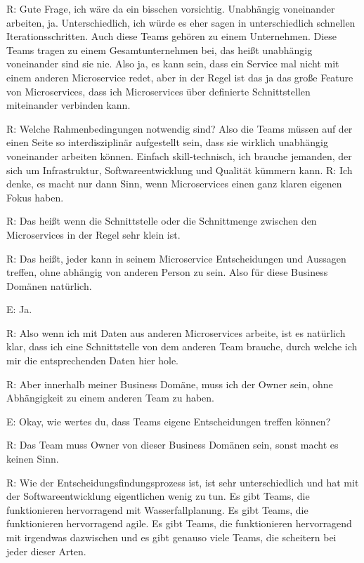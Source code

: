 \label{appendix:r-15}
R: Gute Frage, ich wäre da ein bisschen vorsichtig. Unabhängig voneinander arbeiten, ja. Unterschiedlich, ich würde es eher sagen in unterschiedlich schnellen Iterationsschritten. Auch diese Teams gehören zu einem Unternehmen. Diese Teams tragen zu einem Gesamtunternehmen bei, das heißt unabhängig voneinander sind sie nie.
Also ja, es kann sein, dass ein Service mal nicht mit einem anderen Microservice redet, aber in der Regel ist das ja das große Feature von Microservices, dass ich Microservices über definierte Schnittstellen miteinander verbinden kann.

\label{appendix:r-16}
R: Welche Rahmenbedingungen notwendig sind? Also die Teams müssen auf der einen Seite so interdisziplinär aufgestellt sein, dass sie wirklich unabhängig voneinander arbeiten können. Einfach skill-technisch, ich brauche jemanden, der sich um Infrastruktur, Softwareentwicklung und Qualität kümmern kann.
\label{appendix:r-17}
R: Ich denke, es macht nur dann Sinn, wenn Microservices einen ganz klaren eigenen Fokus haben.

\label{appendix:r-18}
R: Das heißt wenn die Schnittstelle oder die Schnittmenge zwischen den Microservices in der Regel sehr klein ist.

\label{appendix:r-19}
R: Das heißt, jeder kann in seinem Microservice Entscheidungen und Aussagen treffen, ohne abhängig von anderen Person zu sein. Also für diese Business Domänen natürlich. 

E: Ja.

R: Also wenn ich mit Daten aus anderen Microservices arbeite, ist es natürlich klar, dass ich eine Schnittstelle von dem anderen Team brauche, durch welche ich mir die entsprechenden Daten hier hole.

\label{appendix:r-20}
R: Aber innerhalb meiner Business Domäne, muss ich der Owner sein, ohne Abhängigkeit zu einem anderen Team zu haben.

E: Okay, wie wertes du, dass Teams eigene Entscheidungen treffen können?

R: Das Team muss Owner von dieser Business Domänen sein, sonst macht es keinen Sinn.

\label{appendix:r-21}
R: Wie der Entscheidungsfindungsprozess ist, ist sehr unterschiedlich und hat mit der Softwareentwicklung eigentlichen wenig zu tun. Es gibt Teams, die funktionieren hervorragend mit Wasserfallplanung. Es gibt Teams, die funktionieren hervorragend agile. Es gibt Teams, die funktionieren hervorragend mit irgendwas dazwischen und es gibt genauso viele Teams, die scheitern bei jeder dieser Arten.

